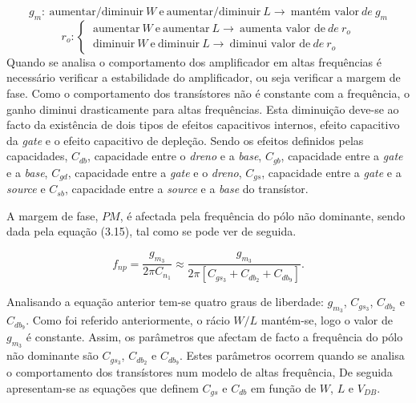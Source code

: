 \documentclass[11pt]{article}
\numberwithin{equation}{section}
\begin{document}
\vspace{-3mm}
\begin{equation}
g_{m}: ~\text{aumentar/diminuir}~W~\text{e}~\text{aumentar/diminuir}~L \rightarrow~\text{mantém valor}~de~g_{m}
\end{equation}
\begin{equation}
r_{o}:  \begin{cases} ~\text{aumentar}~W~\text{e}~\text{aumentar}~L \rightarrow~\text{aumenta valor de}~de~r_{o} \\ ~\text{diminuir}~W~\text{e}~\text{diminuir}~L \rightarrow~\text{diminui valor de}~de~r_{o} \end{cases}
\end{equation}
Quando se analisa o comportamento dos amplificador em altas frequências é necessário verificar a estabilidade do amplificador, ou seja verificar a margem de fase. Como o comportamento dos transístores não é constante com a frequência, o ganho diminui drasticamente para altas frequências. Esta diminuição deve-se ao facto da existência de dois tipos de efeitos capacitivos internos, efeito capacitivo da \textit{gate} e o efeito capacitivo de depleção.
Sendo os efeitos definidos pelas capacidades, $C_{db}$, capacidade entre o \textit{dreno} e a \textit{base}, $C_{gb}$, capacidade entre a \textit{gate} e a \textit{base}, $C_{gd}$, capacidade entre a \textit{gate} e o \textit{dreno}, $C_{gs}$, capacidade entre a \textit{gate} e a \textit{source} e $C_{sb}$, capacidade entre a \textit{source} e a \textit{base} do transístor. 

A margem de fase, $PM$, é afectada pela frequência do pólo não dominante, sendo dada pela equação (3.15), tal como se pode ver de seguida.

\vspace{-3mm}
\begin{equation}
f_{np} = \frac{g_{m_3}}{2\pi C_{n_1}} \approx \frac{g_{m_3}}{2\pi \left[C_{gs_3} + C_{db_2} + C_{db_9}\right]}.
\end{equation}

\vspace{3mm}
Analisando a equação anterior tem-se quatro graus de liberdade: $g_{m_3}$, $C_{gs_3}$, $C_{db_2}$ e $C_{db_9}$. Como foi referido anteriormente, o rácio $W/L$ mantém-se, logo o valor de $g_{m_3}$ é constante. Assim, os parâmetros que afectam de facto a frequência do pólo não dominante são $C_{gs_3}$, $C_{db_2}$ e $C_{db_9}$. Estes parâmetros ocorrem quando se analisa o comportamento dos transístores num modelo de altas frequência,  De seguida apresentam-se as equações que definem $C_{gs}$ e $C_{db}$ em função de $W$, $L$ e $V_{DB}$.
\end{document}
